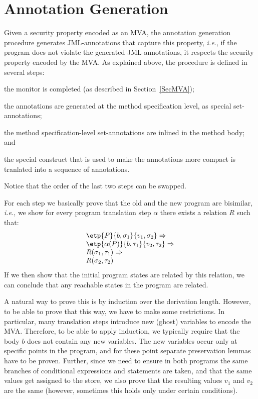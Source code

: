 \section{Annotation Generation}\label{SecAnnotGen} 

Given a security property encoded as an MVA, the annotation generation
procedure generates JML-annotations that capture this property,
\emph{i.e.}, if the program does not violate the generated
JML-annotations, it respects the security property encoded by the
MVA. As explained above, the procedure is defined in several steps:
\begin{inparaenum}
\item the monitor is completed (as described in Section~\ref{SecMVA});
\item the annotations are generated at the method specification level,
as special set-annotations;
\item the method specification-level set-annotations are inlined in
the method body; and
\item the special \CaseJML construct that is used to make the
annotations more compact is tranlated into a sequence of \Set
annotations.
\end{inparaenum} 
Notice that the order of the last two steps can be swapped.

For each step we basically prove that the old and the new program are
bisimilar, \emph{i.e.}, we show for every program translation step
\(\alpha\) there exists a relation \(R\) such that:
\[
\begin{array}{l}
\etp{P}{b,\sigma_1}{v_1, \sigma_2} \Rightarrow\\
\etp{\alpha(P)}{b, \tau_1}{v_2, \tau_2} \Rightarrow\\
R(\sigma_1, \tau_1) \Rightarrow\\
R(\sigma_2, \tau_2) 
\end{array}
\]
If we then show that the initial program states are related by this
relation, we can conclude that any reachable states in the program are
related. 

A natural way to prove this is by induction over the derivation
length. However, to be able to prove that this way, we have to make
some restrictions. In particular, many translation steps introduce new
(ghost) variables to encode the MVA. Therefore, to be able to apply
induction, we typically require that the body \(b\) does not contain
any new variables. The new variables occur only at specific points
in the program, and for these point separate preservation lemmas have
to be proven. Further, since we need to ensure in both programs the
same branches of conditional expressions and statements are taken, and
that the same values get assigned to the store, we also prove that the
resulting values \(v_1\) and \(v_2\) are the same (however, sometimes
this holds only under certain conditions).


